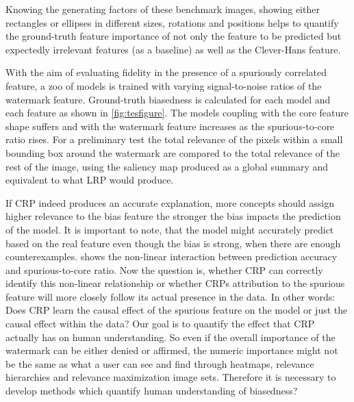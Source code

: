 Knowing the generating factors of these benchmark images, showing either rectangles or ellipses in different sizes, rotations and positions helps to quantify the ground-truth feature importance of not only the feature to be predicted but expectedly irrelevant features (as a baseline) as well as the Clever-Hans feature. 

With the aim of evaluating fidelity in the presence of a spuriously correlated feature, a zoo of models is trained with varying signal-to-noise ratios of the watermark feature. Ground-truth biasedness is calculated for each model and each feature as shown in \cref{fig:tesfigure}. The models coupling with the core feature shape suffers and with the watermark feature increases as the spurious-to-core ratio rises. 
For a preliminary test the total relevance of the pixels within a small bounding box around the watermark are compared to the total relevance of the rest of the image, using the saliency map produced as a global summary and equivalent to what LRP would produce. 

If CRP indeed produces an accurate explanation, more concepts should assign higher relevance to the bias feature the stronger the bias impacts the prediction of the model. It is important to note, that the model might accurately predict based on the real feature even though the bias is strong, when there are enough counterexamples.  shows the non-linear interaction between prediction accuracy and spurious-to-core ratio.
Now the question is, whether CRP can correctly identify this non-linear relationship or whether CRPs attribution to the spurious feature will more closely follow its actual presence in the data. 
In other words: Does CRP learn the causal effect of the spurious feature on the model or just the causal effect within the data? Our goal is to quantify the effect that CRP actually has on human understanding. So even if the overall importance of the watermark can be either denied or affirmed, the numeric importance might not be the same as what a user can see and find through heatmaps, relevance hierarchies and relevance maximization image sets. Therefore it is necessary to develop methods which quantify human understanding of biasedness?  

